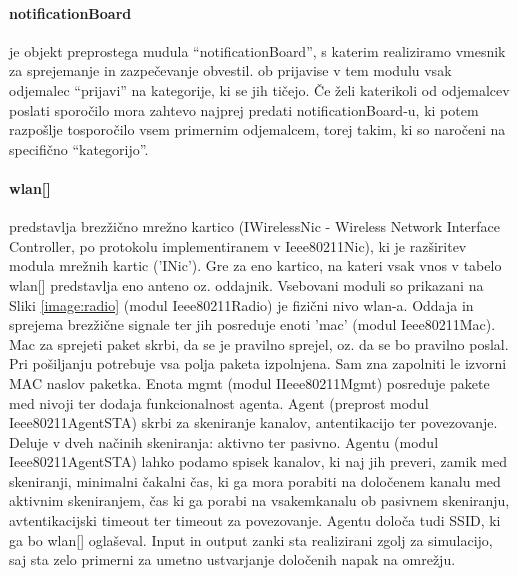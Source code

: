 \documentclass[a4paper,11pt]{article}
\begin{document}
\paragraph{notificationBoard}
\label{description:notificationBoard}

je objekt preprostega mudula ``notificationBoard'', s katerim realiziramo vmesnik za sprejemanje in zazpečevanje obvestil. ob prijavise v tem modulu vsak odjemalec ``prijavi'' na kategorije, ki se jih tičejo. Če želi katerikoli od odjemalcev poslati sporočilo mora zahtevo najprej predati notificationBoard-u, ki potem razpošlje tosporočilo vsem primernim odjemalcem, torej takim, ki so naročeni na specifično ``kategorijo''.

\paragraph{wlan[]}
\label{description:wlan}

predstavlja brezžično mrežno kartico (IWirelessNic - Wireless Network Interface Controller, po protokolu implementiranem v Ieee80211Nic), ki je razširitev modula mrežnih kartic ('INic'). Gre za eno kartico, na kateri vsak vnos v tabelo wlan[] predstavlja eno anteno oz. oddajnik. Vsebovani moduli so prikazani na Sliki \ref{image:radio} (modul Ieee80211Radio) je fizični nivo wlan-a. Oddaja in sprejema brezžične signale ter jih posreduje enoti 'mac' (modul Ieee80211Mac). Mac za sprejeti paket skrbi, da se je pravilno sprejel, oz. da se bo pravilno poslal. Pri pošiljanju potrebuje vsa polja paketa izpolnjena. Sam zna zapolniti le izvorni MAC naslov paketka. Enota mgmt (modul IIeee80211Mgmt) posreduje pakete med nivoji ter dodaja funkcionalnost agenta. Agent (preprost modul Ieee80211AgentSTA) skrbi za skeniranje kanalov, antentikacijo ter povezovanje. Deluje v dveh načinih skeniranja: aktivno ter pasivno. Agentu (modul Ieee80211AgentSTA) lahko podamo spisek kanalov, ki naj jih preveri, zamik med skeniranji, minimalni čakalni čas, ki ga mora porabiti na določenem kanalu med aktivnim skeniranjem, čas ki ga porabi na vsakemkanalu ob pasivnem skeniranju, avtentikacijski timeout ter timeout za povezovanje. Agentu določa tudi SSID, ki ga bo wlan[] oglaševal. Input in output zanki sta realizirani zgolj za simulacijo, saj sta zelo primerni za umetno ustvarjanje določenih napak na omrežju.
\end{document}

